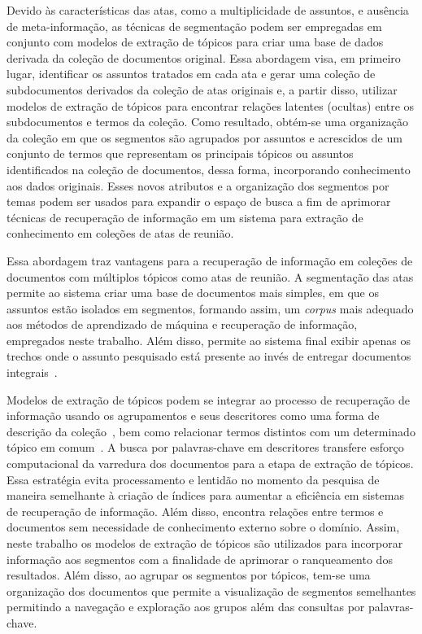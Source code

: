 Devido às características das atas, como a multiplicidade de assuntos, e ausência de meta-informação, as técnicas de segmentação podem ser empregadas em conjunto com modelos de extração de tópicos para criar uma base de dados derivada da coleção de documentos original. 
Essa abordagem visa, em primeiro lugar, identificar os assuntos tratados em cada ata e gerar uma coleção de subdocumentos derivados da coleção de atas originais e, a partir disso, utilizar modelos de extração de tópicos para encontrar relações latentes (ocultas) entre os subdocumentos e termos da coleção.
Como resultado, obtém-se uma organização da coleção em que os segmentos são agrupados por assuntos e acrescidos de um conjunto de termos que representam os principais tópicos ou assuntos identificados na coleção de documentos, dessa forma, incorporando conhecimento aos dados originais. Esses novos atributos e a organização dos segmentos por temas podem ser usados para 
expandir o espaço de busca a fim de aprimorar técnicas de recuperação de informação em um sistema para extração de conhecimento em coleções de atas de reunião.




Essa abordagem traz vantagens para a recuperação de informação em coleções de documentos com múltiplos tópicos como atas de reunião.
A segmentação das atas permite ao sistema criar uma base de documentos mais simples, em que os assuntos estão isolados em segmentos, formando assim, um \textit{corpus} mais adequado aos métodos de aprendizado de máquina e recuperação de informação, empregados neste trabalho. Além disso, permite ao sistema final exibir apenas os trechos onde o assunto pesquisado está presente ao invés de entregar documentos integrais~\cite{Tagarelli2013, Jeong:2010, Prince2007, Huang2003}. 

Modelos de extração de tópicos podem se integrar ao processo de recuperação de informação usando os agrupamentos e seus descritores como uma forma de descrição da coleção~\cite{Zhai2017, Xing2009}, bem como relacionar termos distintos com um determinado tópico em comum~\cite{WEIXING}. A busca por palavras-chave em descritores transfere esforço computacional da varredura dos documentos para a etapa de extração de tópicos. Essa estratégia evita processamento e lentidão no momento da pesquisa de maneira semelhante à criação de índices para aumentar a eficiência em sistemas de recuperação de informação. Além disso, encontra relações entre termos e documentos sem necessidade de conhecimento externo sobre o domínio. Assim, neste trabalho os modelos de extração de tópicos são utilizados para incorporar informação aos segmentos com a finalidade de aprimorar o ranqueamento dos resultados. 
% 
Além disso, ao agrupar os segmentos por tópicos, tem-se uma organização dos documentos que permite a visualização de segmentos semelhantes permitindo a navegação e exploração aos grupos além das consultas por palavras-chave.
%


